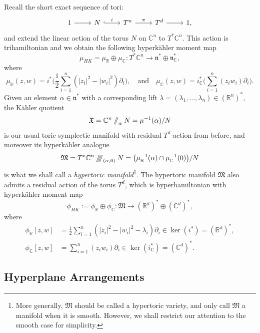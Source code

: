 \documentclass{article}
\newcommand{\K}{K\"ahler }
\newcommand{\HK}{hyperk\"ahler }
\newcommand{\RR}{\mathbb{R}}
\newcommand{\CC}{\mathbb{C}}
\newcommand{\mf}[1]{\mathfrak{#1}}
\newcommand{\sslash}{\mathbin{/\mkern-6mu/}}
\newcommand{\sssslash}{\mathbin{/\mkern-6mu/\mkern-6mu/\mkern-6mu/}}
\newcommand{\prr}{\phi_{\mathbb{R}}}
\newcommand{\pcc}{\phi_{\mathbb{C}}}
\begin{document}
	Recall the short exact sequence of tori:
	\[
	\begin{tikzcd}
		1 \arrow[r] & N \arrow[r, hook, "i"] & T^{n} \arrow[r, "\pi"] &
		T^{d} \arrow[r] & 1,
	\end{tikzcd}
	\]
	and extend the linear action of the torus $N$ on $\CC^{n}$ to $T^{\ast}\CC^{n}$. This action is trihamiltonian and we obtain the following \HK moment map
	$$
	\mu_{HK} = \mu_{\RR} \oplus \mu_{\CC} :T^{\ast}\CC^{n} \longrightarrow \mf{n}^{\ast} \oplus \mf{n}_{\CC}^{\ast},
	$$
	where
	$$
	\mu_{\RR}(z,w) = i^{\ast}\bigg( \frac{1}{2}\sum_{i=1}^{n}( |z_{i}|^{2} - |w_{i}|^{2})\partial_{i} \bigg),\quad \text{and}\quad \mu_{\CC}(z,w) = i_{\CC}^{\ast}\bigg( \sum_{i=1}^{n}(z_{i}w_{i}) \partial_{i} \bigg).
	$$
	Given an element $\alpha \in \mf{n}^{\ast}$ with a corresponding lift $\lambda = (\lambda_{1},\ldots, \lambda_{n}) \in (\RR^{n})^{\ast}$, the \K quotient
	$$
	\mf{X} = \CC^{n}\sslash_{\alpha}N = \mu^{-1}(\alpha)/N
	$$
	is our usual toric symplectic manifold with residual $T^{d}$-action from before, and moreover its \HK analogue
	$$
	\mf{M} = T^{\ast}\CC^{n} \sssslash_{(\alpha,0)} N = \big( \mu_{\RR}^{-1}(\alpha) \cap \mu_{\CC}^{-1}(0)\big)/N
	$$
	is what we shall call a \emph{hypertoric manifold}\footnote{More generally, $\mf{M}$ should be called a hypertoric variety, and only call $\mf{M}$ a manifold when it is smooth. However, we shall restrict our attention to the smooth case for simplicity.}. The hypertoric manifold $\mf{M}$ also admits a residual action of the torus $T^{d}$, which is hyperhamiltonian with \HK moment map
	$$
	\phi_{HK} := \phi_{\RR} \oplus \phi_{\CC}: \mf{M} \longrightarrow (\RR^{d})^{\ast} \oplus (\CC^{d})^{\ast},
	$$
	where
	\begin{equation*}
		\begin{split}
			\prr[z,w] &= \frac{1}{2}\sum_{i=1}^{n}(|z_{i}|^{2} - |w_{i}|^{2} - \lambda_{i})\partial_{i} \in \ker(i^{\ast}) = (\RR^{d})^{\ast},\\
			\pcc[z,w] &= \sum_{i=1}^{n}(z_{i}w_{i}) \partial_{i} \in \ker(i_{\CC}^{\ast}) = (\CC^{d})^{\ast}.
		\end{split}
	\end{equation*}
	
	\subsection{Hyperplane Arrangements}
	
\end{document}
